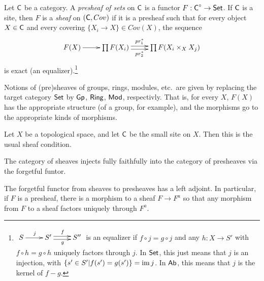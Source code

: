 
\begin{definition}
 Let $\text{\sf C}$ be a category. A \emph{presheaf of sets} on $\text{\sf C}$ is a functor $F:\text{\sf C}^\circ\to \text{\sf Set}$. If $\text{\sf C}$ is a site, then $F$ is a \emph{sheaf} on $(\text{\sf C},Cov)$ if it is a presheaf such that for every object $X\in \text{\sf C}$ and every covering $\{X_i\to X\}\in Cov(X)$, the sequence
 \[\xymatrix{
  F(X)\ar[r] & \prod F(X_i)\ar@<+.5ex>[r]^<>(.5){pr_1^*} \ar@<-.5ex>[r]_<>(.5){pr_2^*}
 & \prod F(X_i\times_X X_j) 
 }\] 
 is exact (an equalizer).\footnote{$\xymatrix{S\ar[r]^{j} & S'\ar@<.5ex>[r]^f \ar@<-.5ex>[r]_g& S''}$ is an equalizer if $f\circ j=g\circ j$ and any $h:X\to S'$ with $f\circ h=g\circ h$ uniquely factors through $j$. In $\text{\sf Set}$, this just means that $j$ is an injection, with $\{s'\in S'|f(s')=g(s')\}=\operatorname{im} j$. In $\text{\sf Ab}$, this means that $j$ is the kernel of $f-g$.}
\end{definition}
\begin{remark}
 Notions of (pre)sheaves of groups, rings, modules, etc.~are given by replacing the target category $\text{\sf Set}$ by $\text{\sf Gp}$, $\text{\sf Ring}$, $\text{\sf Mod}$, respectivly. That is, for every $X$, $F(X)$ has the appropriate structure (of a group, for example), and the morphisms go to the appropriate kinds of morphisms. 
\end{remark}
\begin{example}
 Let $X$ be a topological space, and let $\text{\sf C}$ be the small site on $X$. Then this is the usual sheaf condition.
\end{example}
The category of sheaves injects fully faithfully into the category of presheaves via the forgetful funtor.
\begin{theorem}[Sheafification]
  The forgetful functor from sheaves to presheaves has a left adjoint. In particular, if $F$ is a presheaf, there is a morphism to a sheaf $F\to F^a$ so that any morphism from $F$ to a sheaf factors uniquely through $F^a$.
\end{theorem}

